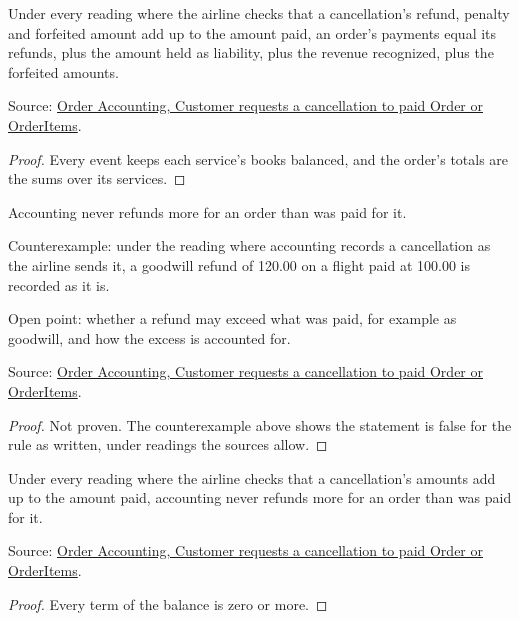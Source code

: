 \begin{theorem}
  \label{thm:accounting-balance-checked}
  Under every reading where the airline checks that a cancellation's
  refund, penalty and forfeited amount add up to the amount paid, an
  order's payments equal its refunds, plus the amount held as liability,
  plus the revenue recognized, plus the forfeited amounts.

  Source: \href{https://standards.atlassian.net/wiki/spaces/OA/pages/844333086}{Order Accounting, Customer requests a cancellation to paid Order or OrderItems}.
\end{theorem}
\begin{proof}
  Every event keeps each service's books balanced, and the order's totals
  are the sums over its services.
\end{proof}

\begin{theorem}
  \label{thm:accounting-refunds-within-payments}
  Accounting never refunds more for an order than was paid for it.

  Counterexample: under the reading where accounting records a
  cancellation as the airline sends it, a goodwill refund of 120.00 on a
  flight paid at 100.00 is recorded as it is.

  Open point: whether a refund may exceed what was paid, for example as
  goodwill, and how the excess is accounted for.

  Source: \href{https://standards.atlassian.net/wiki/spaces/OA/pages/844333086}{Order Accounting, Customer requests a cancellation to paid Order or OrderItems}.
\end{theorem}
\begin{proof}
  Not proven.  The counterexample above shows the statement is false for
  the rule as written, under readings the sources allow.
\end{proof}

\begin{theorem}
  \label{thm:accounting-refunds-checked}
  Under every reading where the airline checks that a cancellation's
  amounts add up to the amount paid, accounting never refunds more for an
  order than was paid for it.

  Source: \href{https://standards.atlassian.net/wiki/spaces/OA/pages/844333086}{Order Accounting, Customer requests a cancellation to paid Order or OrderItems}.
\end{theorem}
\begin{proof}
  Every term of the balance is zero or more.
\end{proof}

